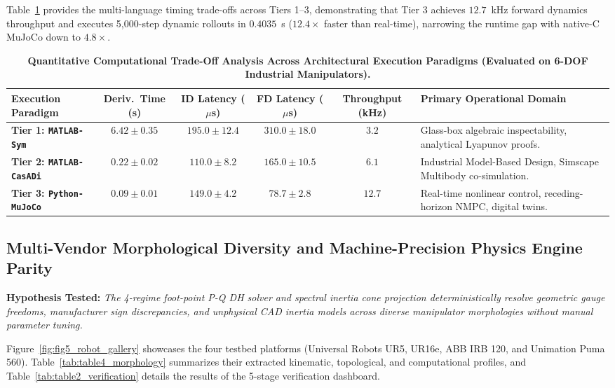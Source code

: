 \documentclass[fleqn,10pt]{article}
\begin{document}
	Table~\ref{tab:table1_tradeoffs} provides the multi-language timing trade-offs across Tiers 1--3, demonstrating that Tier 3 achieves $12.7$~kHz forward dynamics throughput and executes 5,000-step dynamic rollouts in $0.4035$~s ($12.4\times$ faster than real-time), narrowing the runtime gap with native-C MuJoCo down to $4.8\times$.
	
	\begin{table}[!t]
		\caption{\textbf{Quantitative Computational Trade-Off Analysis Across Architectural Execution Paradigms (Evaluated on 6-DOF Industrial Manipulators).}}
		\label{tab:table1_tradeoffs}
		\centering
		\footnotesize
		\begin{tabularx}{\textwidth}{p{3.2cm}cccc>{\raggedright\arraybackslash}X}
			\toprule
			\textbf{Execution Paradigm} & \textbf{Deriv.\ Time (s)} & \textbf{ID Latency ($\mu$s)} & \textbf{FD Latency ($\mu$s)} & \textbf{Throughput (kHz)} & \textbf{Primary Operational Domain} \\
			\midrule
			\textbf{Tier 1: \texttt{MATLAB-Sym}} & $6.42 \pm 0.35$ & $195.0 \pm 12.4$ & $310.0 \pm 18.0$ & $3.2$ & Glass-box algebraic inspectability, analytical Lyapunov proofs. \\
			\textbf{Tier 2: \texttt{MATLAB-CasADi}} & $0.22 \pm 0.02$ & $110.0 \pm 8.2$ & $165.0 \pm 10.5$ & $6.1$ & Industrial Model-Based Design, Simscape Multibody co-simulation. \\
			\textbf{Tier 3: \texttt{Python-MuJoCo}} & $0.09 \pm 0.01$ & $149.0 \pm 4.2$ & $78.7 \pm 2.8$ & $12.7$ & Real-time nonlinear control, receding-horizon NMPC, digital twins. \\
			\bottomrule
		\end{tabularx}
	\end{table}
	
	\subsection*{Multi-Vendor Morphological Diversity and Machine-Precision Physics Engine Parity}
	
	\noindent\textbf{Hypothesis Tested:} \textit{The 4-regime foot-point P-Q DH solver and spectral inertia cone projection deterministically resolve geometric gauge freedoms, manufacturer sign discrepancies, and unphysical CAD inertia models across diverse manipulator morphologies without manual parameter tuning.}
	
	Figure~\ref{fig:fig5_robot_gallery} showcases the four testbed platforms (Universal Robots UR5, UR16e, ABB IRB 120, and Unimation Puma 560). Table~\ref{tab:table4_morphology} summarizes their extracted kinematic, topological, and computational profiles, and Table~\ref{tab:table2_verification} details the results of the 5-stage verification dashboard.
	
\end{document}
